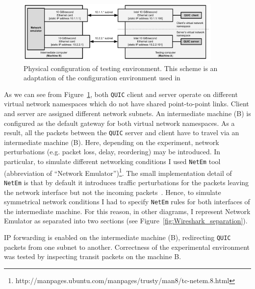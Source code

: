 \documentclass[12pt,a4paper,twoside,openright]{report}
\begin{document}
    \begin{figure}[ht]
    \centering
    \includegraphics[width=0.9\textwidth]{figs/Physical_testing_environment.png}
    \caption[Physical configuration of testing environment]{Physical configuration of testing environment. This scheme is an adaptation of the configuration environment used in ~\cite{Making_QUIC_Quicker}}
    \label{fig:Physical_testing_environment}
    \end{figure}
    
    As we can see from Figure~\ref{fig:Physical_testing_environment}, both \texttt{QUIC} client and server operate on different virtual network namespaces which do not have shared point-to-point links.
    Client and server are assigned different network subnets.
    An intermediate machine (B) is configured as the default gateway for both virtual network namespaces.
    As a result, all the packets between the \texttt{QUIC} server and client have to travel via an intermediate machine (B).
    Here, depending on the experiment, network perturbations (e.g. packet loss, delay, reordering) may be introduced.
    In particular, to simulate different networking conditions I used \texttt{NetEm} tool (abbreviation of \enquote{Network Emulator})\footnote{http://manpages.ubuntu.com/manpages/trusty/man8/tc-netem.8.html}.
    The small implementation detail of \texttt{NetEm} is that by default it introduces traffic perturbations for the packets leaving the network interface but not the incoming packets~\cite{Ubuntu_Manpage_NetEm}.
    Hence, to simulate symmetrical network conditions I had to specify \texttt{NetEm} rules for both interfaces of the intermediate machine.
    For this reason, in other diagrams, I represent Network Emulator as separated into two sections (see Figure~\ref{fig:Wireshark_separation}).
    
    
    IP forwarding is enabled on the intermediate machine (B), redirecting \texttt{QUIC} packets from one subnet to another.
    Correctness of the experimental environment was tested by inspecting transit packets on the machine B.
\end{document}
